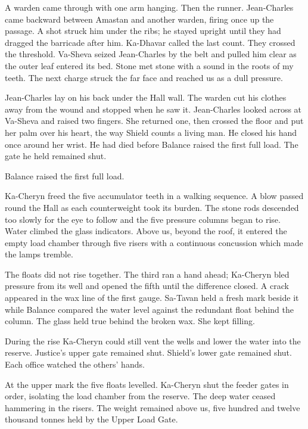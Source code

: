 A warden came through with one arm hanging. Then the runner. Jean-Charles came backward between Amastan and another warden, firing once up the passage. A shot struck him under the ribs; he stayed upright until they had dragged the barricade after him. Ka-Dhavar called the last count. They crossed the threshold. Va-Sheva seized Jean-Charles by the belt and pulled him clear as the outer leaf entered its bed. Stone met stone with a sound in the roots of my teeth. The next charge struck the far face and reached us as a dull pressure.\par

Jean-Charles lay on his back under the Hall wall. The warden cut his clothes away from the wound and stopped when he saw it. Jean-Charles looked across at Va-Sheva and raised two fingers. She returned one, then crossed the floor and put her palm over his heart, the way Shield counts a living man. He closed his hand once around her wrist. He had died before Balance raised the first full load. The gate he held remained shut.\par

\ornament

Balance raised the first full load.\par

Ka-Cheryn freed the five accumulator teeth in a walking sequence. A blow passed round the Hall as each counterweight took its burden. The stone rods descended too slowly for the eye to follow and the five pressure columns began to rise. Water climbed the glass indicators. Above us, beyond the roof, it entered the empty load chamber through five risers with a continuous concussion which made the lamps tremble.\par

The floats did not rise together. The third ran a hand ahead; Ka-Cheryn bled pressure from its well and opened the fifth until the difference closed. A crack appeared in the wax line of the first gauge. Sa-Tavan held a fresh mark beside it while Balance compared the water level against the redundant float behind the column. The glass held true behind the broken wax. She kept filling.\par

During the rise Ka-Cheryn could still vent the wells and lower the water into the reserve. Justice's upper gate remained shut. Shield's lower gate remained shut. Each office watched the others' hands.\par

At the upper mark the five floats levelled. Ka-Cheryn shut the feeder gates in order, isolating the load chamber from the reserve. The deep water ceased hammering in the risers. The weight remained above us, five hundred and twelve thousand tonnes held by the Upper Load Gate.\par


